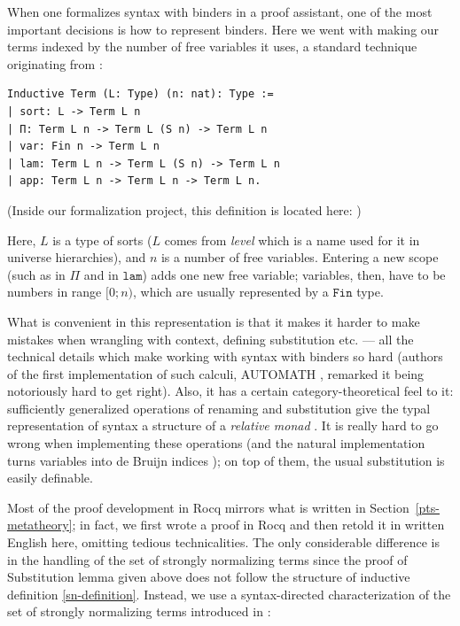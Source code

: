 \documentclass{article}
\theoremstyle{definition}
\theoremstyle{remark}
\begin{document}
When one formalizes syntax with binders in a proof
assistant, one of the most important decisions is how
to represent binders. Here we went with making our
terms indexed by the number of free variables it uses,
a standard technique originating from
\cite{bellegarde1994substitution,bird1999debruijn,
altenkirch1999monadic}:

\begin{verbatim}
Inductive Term (L: Type) (n: nat): Type :=
| sort: L -> Term L n
| Π: Term L n -> Term L (S n) -> Term L n
| var: Fin n -> Term L n
| lam: Term L n -> Term L (S n) -> Term L n
| app: Term L n -> Term L n -> Term L n.
\end{verbatim}

(Inside our formalization project, this definition is
located here: )

Here, $L$ is a type of sorts ($L$ comes from
\emph{level} which is a name used for it in universe
hierarchies), and $n$ is a number of free variables.
Entering a new scope (such as in $\Pi$ and in
$\mathtt{lam}$) adds one new free variable; variables,
then, have to be numbers in range $[0;n)$, which are
usually represented by a $\mathtt{Fin}$ type.

What is convenient in this representation is that it
makes it harder to make mistakes when wrangling with
context, defining substitution etc. --- all the
technical details which make working with syntax with
binders so hard (authors of the first implementation of
such calculi, AUTOMATH \cite{debruijn1972lambda,
debruijn1970automath}, remarked it being notoriously
hard to get right). Also, it has a certain
category-theoretical feel to it: sufficiently
generalized operations of renaming and substitution
give the typal representation of syntax a structure of
a \emph{relative monad} \cite{altenkirch2015monads,
altenkirch1999monadic}. It is really hard to go wrong
when implementing these operations (and the natural
implementation turns variables into de Bruijn indices
\cite{debruijn1972lambda}); on top of them, the usual
substitution is easily definable.

Most of the proof development in Rocq mirrors what is
written in Section~\ref{pts-metatheory}; in fact, we
first wrote a proof in Rocq and then retold it in
written English here, omitting tedious technicalities.
The only considerable difference is in the handling of
the set of strongly normalizing terms since the proof
of Substitution lemma given above does not follow the
structure of inductive definition \ref{sn-definition}.
Instead, we use a syntax-directed characterization of
the set of strongly normalizing terms introduced in
\cite{Joachimski2003Short}:
\end{document}
